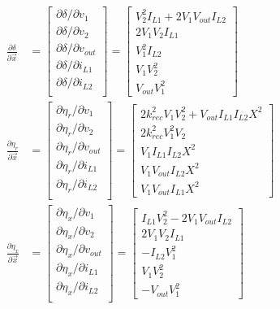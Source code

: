 \documentclass[conference, twocolumn, letterpaper]{IEEEtran}
\begin{document}
\begin{subequations}
	\begin{align}
		\frac{\partial \delta}{\partial \vec{x}} &= \begin{bmatrix}
				\partial \delta / \partial v_1 \\
				\partial \delta / \partial v_2 \\
				\partial \delta / \partial v_{out} \\
				\partial \delta / \partial i_{L1} \\
				\partial \delta / \partial i_{L2} \\
			\end{bmatrix}
			= \begin{bmatrix}
				V_2^2I_{L1} + 2V_1V_{out}I_{L2} \\
				2V_1V_2I_{L1} \\
				V_1^2I_{L2} \\
				V_1V_2^2 \\
				V_{out}V_1^2
			\end{bmatrix} \\[2ex]
		\frac{\partial \eta_r}{\partial \vec{x}} &= \begin{bmatrix}
				\partial \eta_r / \partial v_1 \\
				\partial \eta_r / \partial v_2 \\
				\partial \eta_r / \partial v_{out} \\
				\partial \eta_r / \partial i_{L1} \\
				\partial \eta_r / \partial i_{L2} \\
			\end{bmatrix}
			= \begin{bmatrix}
				2k_{rec}^2V_1V_2^2 + V_{out}I_{L1}I_{L2}X^2 \\
				2k_{rec}^2V_1^2V_2 \\
				V_1I_{L1}I_{L2}X^2 \\
				V_1V_{out}I_{L2}X^2 \\
				V_1V_{out}I_{L1}X^2
			\end{bmatrix} \\
		\frac{\partial \eta_x}{\partial \vec{x}} &= \begin{bmatrix}
				\partial \eta_x / \partial v_1 \\
				\partial \eta_x / \partial v_2 \\
				\partial \eta_x / \partial v_{out} \\
				\partial \eta_x / \partial i_{L1} \\
				\partial \eta_x / \partial i_{L2} \\
			\end{bmatrix}
			= \begin{bmatrix}
				I_{L1}V_2^2 - 2V_1V_{out}I_{L2} \\
				2V_1V_2I_{L1} \\
				-I_{L2}V_1^2 \\
				V_1V_2^2 \\
				-V_{out}V_1^2
			\end{bmatrix}
	\end{align}
\end{subequations}
\end{document}
